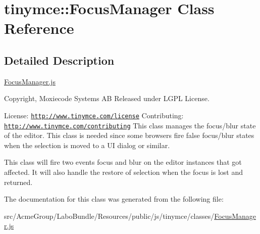 \hypertarget{classtinymce_1_1_focus_manager}{\section{tinymce\+:\+:Focus\+Manager Class Reference}
\label{classtinymce_1_1_focus_manager}
}


\subsection{Detailed Description}
\hyperlink{_focus_manager_8js}{Focus\+Manager.\+js}

Copyright, Moxiecode Systems A\+B Released under L\+G\+P\+L License.

License\+: \href{http://www.tinymce.com/license}{\tt http\+://www.\+tinymce.\+com/license} Contributing\+: \href{http://www.tinymce.com/contributing}{\tt http\+://www.\+tinymce.\+com/contributing} This class manages the focus/blur state of the editor. This class is needed since some browsers fire false focus/blur states when the selection is moved to a U\+I dialog or similar.

This class will fire two events focus and blur on the editor instances that got affected. It will also handle the restore of selection when the focus is lost and returned. 

The documentation for this class was generated from the following file\+:\begin{DoxyCompactItemize}
\item 
src/\+Acme\+Group/\+Labo\+Bundle/\+Resources/public/js/tinymce/classes/\hyperlink{_focus_manager_8js}{Focus\+Manager.\+js}\end{DoxyCompactItemize}
